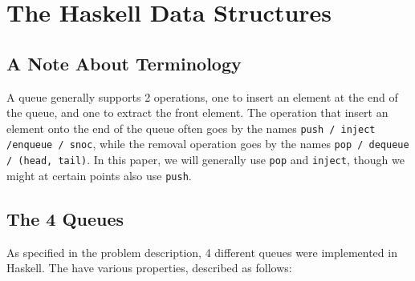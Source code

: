 \section{The Haskell Data Structures}

\subsection{A Note About Terminology}

A queue generally supports 2 operations, one to insert an element at the end of the queue, and one to extract the front element.
The operation that insert an element onto the end of the queue often goes by the names \texttt{push / inject /enqueue / snoc}, while the removal operation goes by the names \texttt{pop / dequeue / (head, tail)}. In this paper, we will generally use \texttt{pop} and \texttt{inject}, though we might at certain points also use \texttt{push}.

\subsection{The 4 Queues}
As specified in the problem description, 4 different queues were implemented in Haskell. The have various properties, described as follows:

